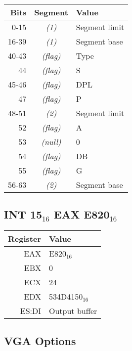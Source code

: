 \documentclass{article}
\begin{document}
\begin{tabular}{|r|c|l|}
	\hline
	\textbf{Bits} & \textbf{Segment} & \textbf{Value} \\
	\hline
	0-15 & \emph{(1)} & Segment limit \\
	\hline
	16-39 & \emph{(1)} & Segment base \\
	\hline
	40-43 & \emph{(flag)} & Type \\
	\hline
	44 & \emph{(flag)} & S \\
	\hline
	45-46 & \emph{(flag)} & DPL \\
	\hline
	47 & \emph{(flag)} & P \\
	\hline
	48-51 & \emph{(2)} & Segment limit \\
	\hline
	52 & \emph{(flag)} & A \\
	\hline
	53 & \emph{(null)} & 0 \\
	\hline
	54 & \emph{(flag)} & DB \\
	\hline
	55 & \emph{(flag)} & G \\
	\hline
	56-63 & \emph{(2)} & Segment base \\
	\hline
\end{tabular}

\subsection{INT 15$_{16}$ EAX E820$_{16}$}
\label{int 15 0xe820}

\begin{tabular}{|r|l|}
	\hline
	\textbf{Register} & \textbf{Value} \\
	\hline
	EAX & E820$_{16}$ \\
	\hline
	EBX & 0 \\
	\hline
	ECX & 24 \\
	\hline
	EDX & 534D4150$_{16}$ \\
	\hline
	ES:DI & Output buffer \\
	\hline
\end{tabular}

\subsection{VGA Options}
\label{vga}
\end{document}
